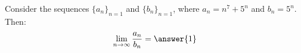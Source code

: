 \documentclass{ximera}
\author{Jim Talamo}
\begin{document}
\begin{exercise}

Consider the sequences $\{a_n \}_{n=1}$ and $\{b_n \}_{n=1}$, where $a_n =n^7+5^n$ and $b_n = 5^n$.  Then:
\[
\lim_{n \to \infty} \frac{a_n}{b_n} = \answer{1}
\]

\end{exercise}
\end{document}
